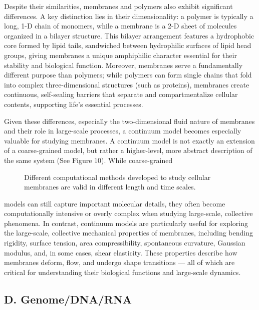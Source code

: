 \documentclass[12pt]{article}
\begin{document}
\begin{flushleft}
Despite their similarities, membranes and polymers also exhibit significant differences. A key distinction lies in their dimensionality: a polymer is typically a long, 1-D chain of monomers, while a membrane is a 2-D sheet of molecules organized in a bilayer structure. This bilayer arrangement features a hydrophobic core formed by lipid tails, sandwiched between hydrophilic surfaces of lipid head groups, giving membranes a unique amphiphilic character essential for their stability and biological function. Moreover, membranes serve a fundamentally different purpose than polymers; while polymers can form single chains that fold into complex three-dimensional structures (such as proteins), membranes create continuous, self-sealing barriers that separate and compartmentalize cellular contents, supporting life’s essential processes.


Given these differences, especially the two-dimensional fluid nature of membranes and their role in large-scale processes, a continuum model becomes especially valuable for studying membranes. A continuum model is not exactly an extension of a coarse-grained model, but rather a higher-level, more abstract description of the same system (See Figure 10). While coarse-grained

\begin{figure}[!ht]
  \centering
  \caption{Different computational methods developed to study cellular membranes are valid in different length and time scales.\cite{chabanon2017systems}}
\end{figure}



\noindent models can still capture important molecular details, they often become computationally intensive or overly complex when studying large-scale, collective phenomena. In contrast, continuum models are particularly useful for exploring the large-scale, collective mechanical properties of membranes, including bending rigidity, surface tension, area compressibility, spontaneous curvature, Gaussian modulus, and, in some cases, shear elasticity. These properties describe how membranes deform, flow, and undergo shape transitions — all of which are critical for understanding their biological functions and large-scale dynamics.


\subsection*{D. Genome/DNA/RNA}


\end{flushleft}
\end{document}
